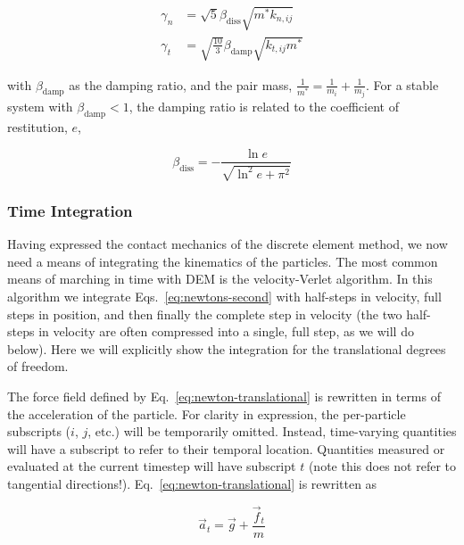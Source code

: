 \begin{subequations}
\begin{align}
	\gamma_n &= \sqrt{5}\beta_\text{diss}\sqrt{m^*k_{n,ij}} \\
	\gamma_t &= \sqrt{\frac{10}{3}}\beta_\text{damp}\sqrt{k_{t,ij} m^*}
\end{align}
\end{subequations}

with $\beta_\text{damp}$ as the damping ratio, and the pair mass, $\frac{1}{m^*} = \frac{1}{m_i} + \frac{1}{m_j}$. For a stable system with $\beta_\text{damp} < 1$, the damping ratio is related to the coefficient of restitution, $e$,

\begin{equation}
	\beta_\text{diss} = -\frac{\ln{e}}{\sqrt{\ln^2{e}+\pi^2}}
\end{equation}





\subsubsection{Time Integration}\label{sec:velocity-verlet}

Having expressed the contact mechanics of the discrete element method, we now need a means of integrating the kinematics of the particles. The most common means of marching in time with DEM is the velocity-Verlet algorithm\cite{Kruggel-Emden2008}. In this algorithm we integrate Eqs.~\ref{eq:newtons-second} with half-steps in velocity, full steps in position, and then finally the complete step in velocity (the two half-steps in velocity are often compressed into a single, full step, as we will do below). Here we will explicitly show the integration for the translational degrees of freedom. 

The force field defined by Eq.~\ref{eq:newton-translational} is rewritten in terms of the acceleration of the particle. For clarity in expression, the per-particle subscripts ($i$, $j$, etc.) will be temporarily omitted. Instead, time-varying quantities will have a subscript to refer to their temporal location. Quantities measured or evaluated at the current timestep will have subscript $t$ (note this does not refer to tangential directions!). Eq.~\ref{eq:newton-translational} is rewritten as

\begin{equation}\label{eq:newton-acceleration}
	\vec{a}_t = \vec{g} + \frac{\vec{f}_t}{m}
\end{equation}

